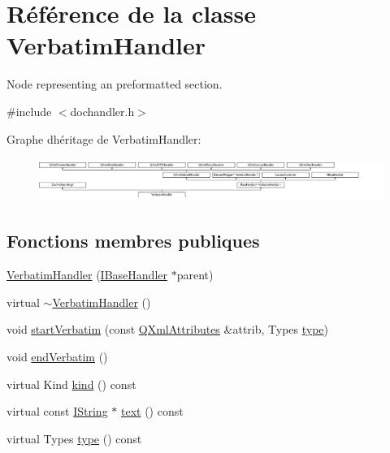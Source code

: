 \hypertarget{class_verbatim_handler}{}\section{Référence de la classe Verbatim\+Handler}
\label{class_verbatim_handler}


Node representing an preformatted section.  




{\ttfamily \#include $<$dochandler.\+h$>$}

Graphe d\textquotesingle{}héritage de Verbatim\+Handler\+:\begin{figure}[H]
\begin{center}
\leavevmode
\includegraphics[height=1.409692cm]{class_verbatim_handler}
\end{center}
\end{figure}
\subsection*{Fonctions membres publiques}
\begin{DoxyCompactItemize}
\item 
\hyperlink{class_verbatim_handler_a14b51644821b88fd7a9e0b144969ec4b}{Verbatim\+Handler} (\hyperlink{class_i_base_handler}{I\+Base\+Handler} $\ast$parent)
\item 
virtual \hyperlink{class_verbatim_handler_abc13313a5cd3b0a7ec056599f950526b}{$\sim$\+Verbatim\+Handler} ()
\item 
void \hyperlink{class_verbatim_handler_a3b2a644064db516a90a1cda92a6912fa}{start\+Verbatim} (const \hyperlink{class_q_xml_attributes}{Q\+Xml\+Attributes} \&attrib, Types \hyperlink{class_verbatim_handler_ad686075f13abded29f61d9e790c4b29f}{type})
\item 
void \hyperlink{class_verbatim_handler_a50877539194a3416c096688361cab078}{end\+Verbatim} ()
\item 
virtual Kind \hyperlink{class_verbatim_handler_a7939f8a0c2175c584f0a50a2a3d088f0}{kind} () const 
\item 
virtual const \hyperlink{class_i_string}{I\+String} $\ast$ \hyperlink{class_verbatim_handler_a5e3238409efeedf09c7762c6934ec0db}{text} () const 
\item 
virtual Types \hyperlink{class_verbatim_handler_ad686075f13abded29f61d9e790c4b29f}{type} () const 
\end{DoxyCompactItemize}
